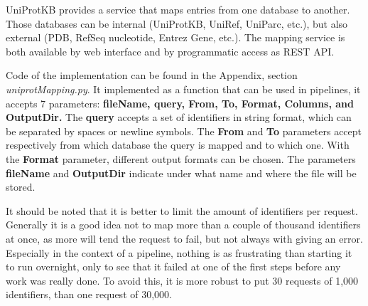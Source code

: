 UniProtKB provides a service that maps entries from one database to another.
Those databases can be internal (UniProtKB, UniRef, UniParc, etc.),
but also external (PDB, RefSeq nucleotide, Entrez Gene, etc.). 
The mapping service is both available by web interface and by programmatic access as REST API.

Code of the implementation can be found in the Appendix, section \textit{uniprotMapping.py}.
It implemented as a function that can be used in pipelines,
it accepts 7 parameters:
\textbf{
fileName,
query,
From,
To,
Format,
Columns,
and
OutputDir.
}
The \textbf{query} accepts a set of identifiers in string format, which can be separated by spaces or newline symbols.
The \textbf{From} and \textbf{To} parameters accept respectively from which database the query is mapped and to which one.
With the \textbf{Format} parameter,  different output formats can be chosen.
The parameters \textbf{fileName} and \textbf{OutputDir} indicate under what name and where the file will be stored.

It should be noted that it is better to limit the amount of identifiers per request.
Generally it is a good idea not to map more than a couple of thousand identifiers at once,
as more will tend the request to fail, 
but not always with giving an error.
Especially in the context of a pipeline, 
nothing is as frustrating than starting it to run overnight,
only to see that it failed at one of the first steps before any work was really done.
To avoid this, it is more robust to put 30 requests of 1,000 identifiers, than one request of 30,000.
